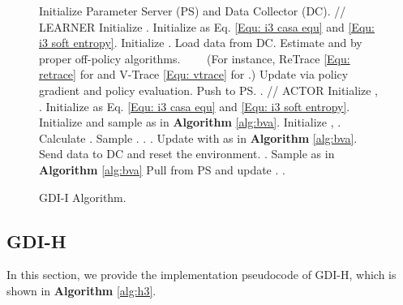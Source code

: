 \documentclass[nohyperref]{article}
\theoremstyle{plain}
\begin{document}
\begin{figure}[ht]
  \centering
  \begin{minipage}{.7\linewidth}
    \begin{algorithm}[H]
      \caption{GDI-I Algorithm.}  
          \begin{algorithmic}
            \STATE Initialize Parameter Server (PS) and Data Collector (DC).
            \STATE
            \STATE // LEARNER
            \STATE Initialize .
            \STATE Initialize  as Eq. \eqref{Equ: i3 casa equ} and \eqref{Equ: i3 soft entropy}.
            \STATE Initialize .
            \WHILE{}
                \STATE Load data from DC.
                \STATE Estimate  and  by proper off-policy algorithms.
                \STATE \ \ \ \ (For instance, ReTrace \eqref{Equ: retrace} for  and V-Trace \eqref{Equ: vtrace} for .)
                \STATE Update  via policy gradient and policy evaluation.
                    \STATE Push  to PS.
                \ENDIF
                \STATE .
            \ENDWHILE
            \STATE
            \STATE // ACTOR
            \STATE Initialize , .
            \STATE Initialize  as Eq. \eqref{Equ: i3 casa equ} and \eqref{Equ: i3 soft entropy}.
            \STATE Initialize  and sample  as in \textbf{Algorithm} \ref{alg:bva}.
            \STATE Initialize , .
            \WHILE{}
                \STATE Calculate .
                \STATE Sample .
                \STATE .
                \STATE .
                \IF{}
                    \STATE Update  with  as in \textbf{Algorithm} \ref{alg:bva}.
                    \STATE Send data to DC and reset the environment.
                    \STATE .
                    \STATE Sample  as in \textbf{Algorithm} \ref{alg:bva}
                \ENDIF
                    \STATE Pull  from PS and update .
                \ENDIF
                \STATE .
            \ENDWHILE
          \end{algorithmic}
        \label{alg:i3}
    \end{algorithm}
  \end{minipage}
\end{figure}

\clearpage
\subsection{GDI-H}
In this section, we provide the implementation pseudocode of GDI-H, which is shown in \textbf{Algorithm} \ref{alg:h3}.
\end{document}
